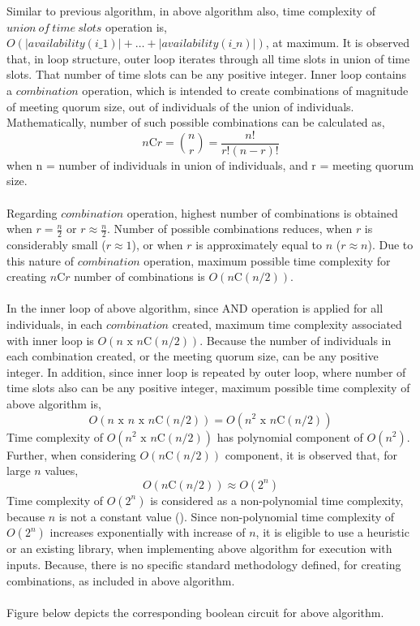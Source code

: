 Similar to previous algorithm, in above algorithm also, time complexity of $union\ of\ time\ slots$ operation is, $O(|availability(i\_1)| + \dots + |availability(i\_n)|)$, at maximum. It is observed that, in loop structure, outer loop iterates through all time slots in union of time slots. That number of time slots can be any positive integer. Inner loop contains a $combination$ operation, which is intended to create combinations of magnitude of meeting quorum size, out of individuals of the union of individuals. Mathematically, number of such possible combinations can be calculated as,
\[ n \text{C} r = \binom{n}{r} = \frac{n!}{r!(n-r)!} \]
when n = number of individuals in union of individuals, and r = meeting quorum size.\\ \\
Regarding $combination$ operation, highest number of combinations is obtained when $r = \frac{n}{2}$ or $r \approx \frac{n}{2}$. Number of possible combinations reduces, when $r$ is considerably small ($r \approx 1$), or when $r$ is approximately equal to $n$ ($r \approx n$). Due to this nature of $combination$ operation, maximum possible time complexity for creating $n \text{C} r$ number of combinations is $O(n \text{C} (n/2))$.\\ \\
In the inner loop of above algorithm, since AND operation is applied for all individuals, in each $combination$ created, maximum time complexity associated with inner loop is $O(n \text{ x } n \text{C} (n/2))$. Because the number of individuals in each combination created, or the meeting quorum size, can be any positive integer. In addition, since inner loop is repeated by outer loop, where number of time slots also can be any positive integer, maximum possible time complexity of above algorithm is, 
\[O(n \text{ x } n \text{ x } n \text{C} (n/2)) = O(n^{2} \text{ x } n \text{C} (n/2)) \]
Time complexity of $O(n^{2} \text{ x } n \text{C} (n/2))$ has polynomial component of $O(n^{2})$. Further, when considering $O(n \text{C} (n/2))$ component, it is observed that, for large $n$ values, 
\[ O(n \text{C} (n/2)) \approx O(2^{n}) \]
Time complexity of $O(2^{n})$ is considered as a non-polynomial time complexity, because $n$ is not a constant value (\cite{pfleeger1996chapter3}). Since non-polynomial time complexity of $O(2^{n})$ increases exponentially with increase of $n$, it is eligible to use a heuristic or an existing library, when implementing above algorithm for execution with inputs. Because, there is no specific standard methodology defined, for creating combinations, as included in above algorithm.\\ \\
Figure below depicts the corresponding boolean circuit for above algorithm.\\ \\

